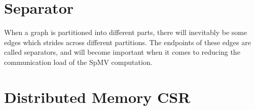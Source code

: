 \section{Separator}
When a graph is partitioned into different parts, there will inevitably be some edges which strides across different partitions. The endpoints of these edges are called separators, and will become important when it comes to reducing the communication load of the SpMV computation.



\section{Distributed Memory CSR}








